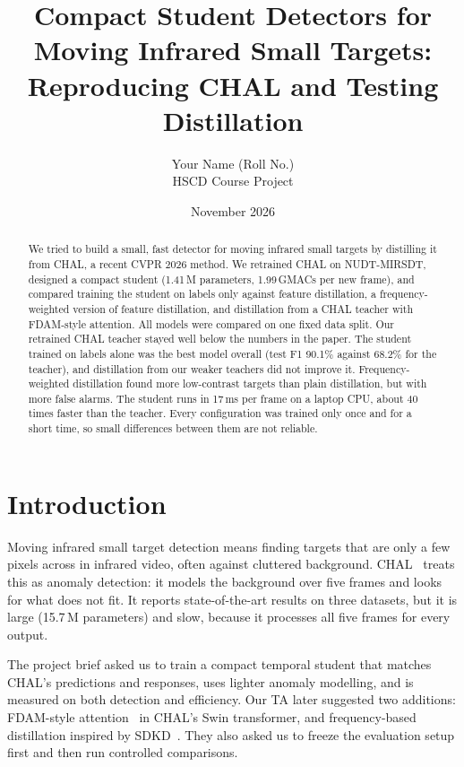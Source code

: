 \documentclass[11pt,a4paper]{article}
\title{Compact Student Detectors for Moving Infrared Small Targets:\\
Reproducing CHAL and Testing Distillation}
\author{Your Name (Roll No.) \\ HSCD Course Project}
\date{November 2026}
\begin{document}
\maketitle

\begin{abstract}
We tried to build a small, fast detector for moving infrared small targets by distilling it from CHAL, a recent
CVPR 2026 method. We retrained CHAL on NUDT-MIRSDT, designed a compact student (1.41\,M parameters, 1.99\,GMACs
per new frame), and compared training the student on labels only against feature distillation, a frequency-weighted
version of feature distillation, and distillation from a CHAL teacher with FDAM-style attention. All models were
compared on one fixed data split. Our retrained CHAL teacher stayed well below the numbers in the paper. The
student trained on labels alone was the best model overall (test F1 90.1\% against 68.2\% for the teacher), and
distillation from our weaker teachers did not improve it. Frequency-weighted distillation found more low-contrast
targets than plain distillation, but with more false alarms. The student runs in 17\,ms per frame on a laptop CPU,
about 40 times faster than the teacher. Every configuration was trained only once and for a short time, so small
differences between them are not reliable.
\end{abstract}

\section{Introduction}

Moving infrared small target detection means finding targets that are only a few pixels across in infrared video,
often against cluttered background. CHAL~\cite{chal} treats this as anomaly detection: it models the background
over five frames and looks for what does not fit. It reports state-of-the-art results on three datasets, but it is
large (15.7\,M parameters) and slow, because it processes all five frames for every output.

The project brief asked us to train a compact temporal student that matches CHAL's predictions and responses, uses
lighter anomaly modelling, and is measured on both detection and efficiency. Our TA later suggested two additions:
FDAM-style attention~\cite{fdam} in CHAL's Swin transformer, and frequency-based distillation inspired by
SDKD~\cite{sdkd}. They also asked us to freeze the evaluation setup first and then run controlled comparisons.
\end{document}
